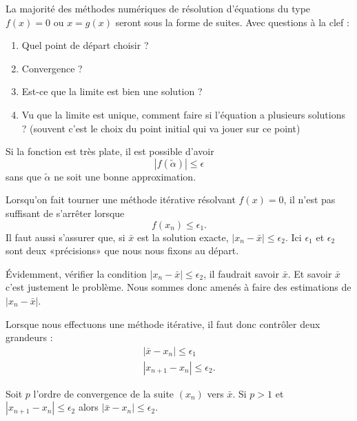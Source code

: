 La majorité des méthodes numériques de résolution d'équations du type \( f(x)=0\) ou \( x=g(x)\) seront sous la forme de suites. Avec questions à la clef :
\begin{enumerate}
	\item
	      Quel point de départ choisir ?
	\item
	      Convergence ?
	\item
	      Est-ce que la limite est bien une solution ?
	\item
	      Vu que la limite est unique, comment faire si l'équation a plusieurs solutions ? (souvent c'est le choix du point initial qui va jouer sur ce point)
\end{enumerate}

\begin{normaltext}
	Si la fonction est très plate, il est possible d'avoir
	\begin{equation}
		| f(\tilde \alpha) |\leq \epsilon
	\end{equation}
	sans que \( \tilde \alpha\) ne soit une bonne approximation.

	Lorsqu'on fait tourner une méthode itérative résolvant \( f(x)=0\), il n'est pas suffisant de s'arrêter lorsque
	\begin{equation}
		f(x_n)\leq \epsilon_1.
	\end{equation}
	Il faut aussi s'assurer que, si \( \bar x\) est la solution exacte, \( | x_n-\bar x |\leq \epsilon_2\). Ici \( \epsilon_1\) et \( \epsilon_2\) sont deux «précisions» que nous nous fixons au départ.

	Évidemment, vérifier la condition \( | x_n-\bar x |\leq \epsilon_2\), il faudrait savoir \( \bar x\). Et savoir \( \bar x\) c'est justement le problème. Nous sommes donc amenés à faire des estimations de \( | x_n-\bar x |\).
\end{normaltext}

\begin{normaltext}
	Lorsque nous effectuons une méthode itérative, il faut donc contrôler deux grandeurs :
	\begin{subequations}
		\begin{align}
			| \bar x-x_n |\leq \epsilon_1 \\
			| x_{n+1}-x_n |\leq \epsilon_2.
		\end{align}
	\end{subequations}
\end{normaltext}

\begin{proposition}
	Soit \( p\) l'ordre de convergence de la suite \( (x_n)\) vers \( \bar x\). Si \( p>1\) et \( | x_{n+1}-x_n |\leq \epsilon_2\) alors \( | \bar x-x_n |\leq \epsilon_2\).
\end{proposition}

